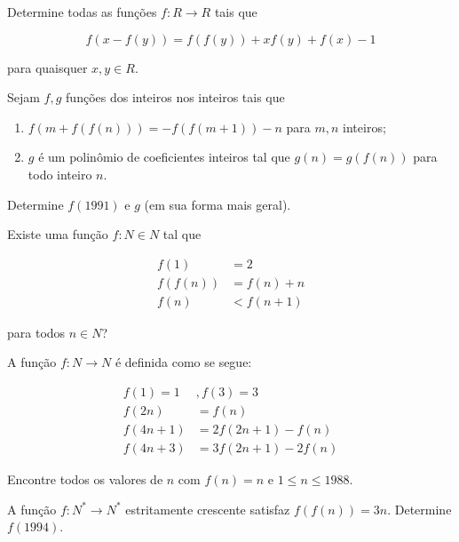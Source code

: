 \begin{questao}
  Determine todas as funções $f: R \rightarrow R$ tais que

  $$ f(x-f(y)) = f(f(y)) + xf(y) +f(x) - 1 $$

  para quaisquer $x,y \in R$.
\end{questao}

\begin{questao}
  Sejam $f,g$ funções dos inteiros nos inteiros tais que

  \begin{enumerate}

  \item $f(m+f(f(n))) = -f(f(m+1))-n$ para $m,n$ inteiros;

  \item $g$ é um polinômio de coeficientes inteiros tal que $g(n) = g(f(n))$
    para todo inteiro $n$.
  \end{enumerate}


  Determine $f(1991)$ e $g$ (em sua forma mais geral).
\end{questao}

\begin{questao}
  Existe uma função $f: N \in N$ tal que

  \begin{align}
    f(1) &= 2 \\ f(f(n)) &= f(n) + n \\ f(n) &< f(n+1)
  \end{align}

  para todos $n \in N$?
\end{questao}

\begin{questao}
  A função $f:N \rightarrow N$ é definida como se segue:

  \begin{align}
    f(1)=1 &, f(3)=3 \\ f(2n) &= f(n) \\ f(4n+1) &= 2f(2n+1) - f(n) \\ f(4n+3)
    &= 3f(2n+1) - 2f(n)
  \end{align}

  Encontre todos os valores de $n$ com $f(n)=n$ e $1 \leq n \leq 1988$.
\end{questao}

\begin{questao}
  A função $f:N^{*} \rightarrow N^{*}$ estritamente crescente satisfaz $f(f(n))
  = 3n$. Determine $f(1994)$.
\end{questao}

